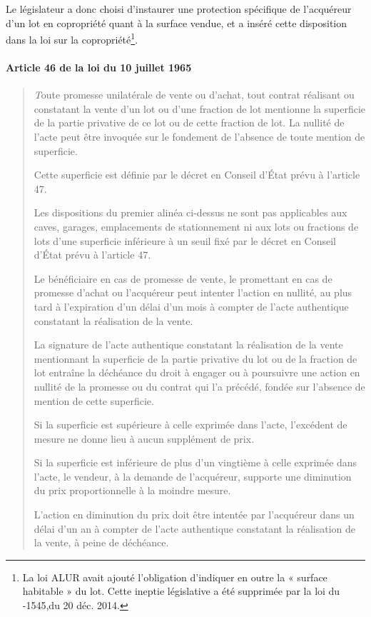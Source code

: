 		Le législateur a donc choisi d’instaurer une protection spécifique de l’acquéreur d’un lot en copropriété
		quant à la surface vendue, et a inséré cette disposition dans la loi sur la copropriété\footnote{La loi ALUR avait ajouté l’obligation d’indiquer en outre la « surface habitable » du lot. Cette ineptie législative a été supprimée par	la loi du -1545,du 20 déc. 2014.}.
		
		\paragraph{Article 46 de la loi du 10 juillet 1965}
		
		\begin{quote}
			{\emph Toute promesse unilatérale de vente ou d'achat, tout contrat réalisant ou constatant la vente d'un lot ou
			d'une fraction de lot mentionne la superficie de la partie privative de ce lot ou de cette fraction de lot. La
			nullité de l'acte peut être invoquée sur le fondement de l'absence de toute mention de superficie.
			
			Cette superficie est définie par le décret en Conseil d'État prévu à l'article 47.
			
			Les dispositions du premier alinéa ci-dessus ne sont pas applicables aux caves, garages, emplacements de
			stationnement ni aux lots ou fractions de lots d'une superficie inférieure à un seuil fixé par le décret en
			Conseil d'État prévu à l'article 47.
			
			Le bénéficiaire en cas de promesse de vente, le promettant en cas de promesse d'achat ou l'acquéreur peut
			intenter l'action en nullité, au plus tard à l'expiration d'un délai d'un mois à compter de l'acte authentique
			constatant la réalisation de la vente.
			
			La signature de l’acte authentique constatant la réalisation de la vente mentionnant la superficie de la
			partie privative du lot ou de la fraction de lot entraîne la déchéance du droit à engager ou à poursuivre une
			action en nullité de la promesse ou du contrat qui l’a précédé, fondée sur l’absence de mention de cette
			superficie.
			
			Si la superficie est supérieure à celle exprimée dans l’acte, l’excédent de mesure ne donne lieu à aucun
			supplément de prix.
			
			Si la superficie est inférieure de plus d’un vingtième à celle exprimée dans l’acte, le vendeur, à la demande
			de l’acquéreur, supporte une diminution du prix proportionnelle à la moindre mesure.
			
			L’action en diminution du prix doit être intentée par l’acquéreur dans un délai d’un an à compter de l’acte
			authentique constatant la réalisation de la vente, à peine de déchéance.}
		\end{quote}
	
